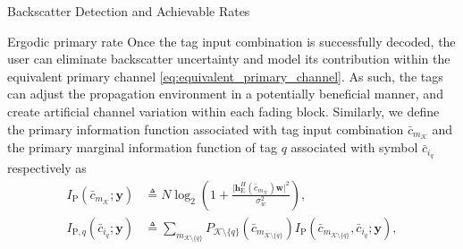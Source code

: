 \documentclass[journal]{IEEEtran}
\begin{document}
\begin{section}{Backscatter Detection and Achievable Rates}
		\begin{subsection}{Ergodic primary rate}
			Once the tag input combination is successfully decoded, the user can eliminate backscatter uncertainty and model its contribution within the equivalent primary channel \eqref{eq:equivalent_primary_channel}. As such, the tags can adjust the propagation environment in a potentially beneficial manner, and create artificial channel variation within each fading block. Similarly, we define the primary information function associated with tag input combination $\bar{c}_{m_{\mathcal{K}}}$ and the primary marginal information function of tag $q$ associated with symbol $\bar{c}_{i_q}$ respectively as
			\begin{align}
				I_{\mathrm{P}}(\bar{c}_{m_{\mathcal{K}}};\boldsymbol{y})
				& \triangleq N \log_2 \left(1 + \frac{\lvert \boldsymbol{h}_{\mathrm{E}}^H(\bar{c}_{m_{\mathcal{K}}}) \boldsymbol{w} \rvert^2}{\sigma_w^2}\right),\label{eq:primary_information_function}\\
				I_{\mathrm{P},q}(\bar{c}_{i_q};\boldsymbol{y})
				& \triangleq \sum_{m_{\mathcal{K} \setminus \{q\}}} P_{\mathcal{K} \setminus \{q\}}(\bar{c}_{m_{\mathcal{K} \setminus \{q\}}}) I_{\mathrm{P}}(\bar{c}_{m_{\mathcal{K} \setminus \{q\}}},\bar{c}_{i_q};\boldsymbol{y}),\label{eq:primary_marginal_information_function}
			\end{align}

\end{subsection}
\end{section}
\end{document}
